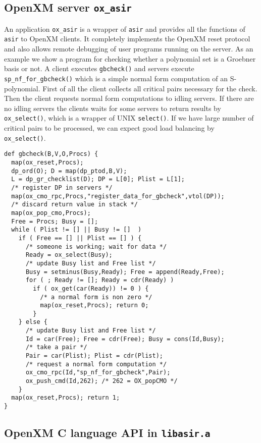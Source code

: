 \documentclass[runningheads]{cl2emult}
\begin{document}
\subsection{OpenXM server {\tt ox\_asir}}

An application {\tt ox\_asir} is a wrapper of {\tt asir} and provides
all the functions of {\tt asir} to OpenXM clients. It completely
implements the OpenXM reset protocol and also allows remote
debugging of user programs running on the server. As an example we
show a program for checking whether a polynomial set is a Groebner
basis or not. A client executes {\tt gbcheck()} and servers execute
{\tt sp\_nf\_for\_gbcheck()} which is a simple normal form computation
of an S-polynomial. First of all the client collects all critical pairs
necessary for the check. Then the client requests normal form
computations to idling servers. If there are no idling servers the
clients waits for some servers to return results by {\tt
ox\_select()}, which is a wrapper of UNIX {\tt select()}. If we have
large number of critical pairs to be processed, we can expect good
load balancing by {\tt ox\_select()}.

\begin{verbatim}
def gbcheck(B,V,O,Procs) {
  map(ox_reset,Procs);
  dp_ord(O); D = map(dp_ptod,B,V);  
  L = dp_gr_checklist(D); DP = L[0]; Plist = L[1];
  /* register DP in servers */
  map(ox_cmo_rpc,Procs,"register_data_for_gbcheck",vtol(DP));
  /* discard return value in stack */
  map(ox_pop_cmo,Procs);
  Free = Procs; Busy = [];
  while ( Plist != [] || Busy != []  )
    if ( Free == [] || Plist == [] ) {
      /* someone is working; wait for data */
      Ready = ox_select(Busy);
	  /* update Busy list and Free list */
      Busy = setminus(Busy,Ready); Free = append(Ready,Free);
      for ( ; Ready != []; Ready = cdr(Ready) )
        if ( ox_get(car(Ready)) != 0 ) {
		  /* a normal form is non zero */
          map(ox_reset,Procs); return 0;
        }
    } else {
	  /* update Busy list and Free list */
      Id = car(Free); Free = cdr(Free); Busy = cons(Id,Busy);
	  /* take a pair */
	  Pair = car(Plist); Plist = cdr(Plist);
	  /* request a normal form computation */
      ox_cmo_rpc(Id,"sp_nf_for_gbcheck",Pair);
      ox_push_cmd(Id,262); /* 262 = OX_popCMO */
    }
  map(ox_reset,Procs); return 1;
}
\end{verbatim}

\subsection{OpenXM C language API in {\tt libasir.a}}
\end{document}
